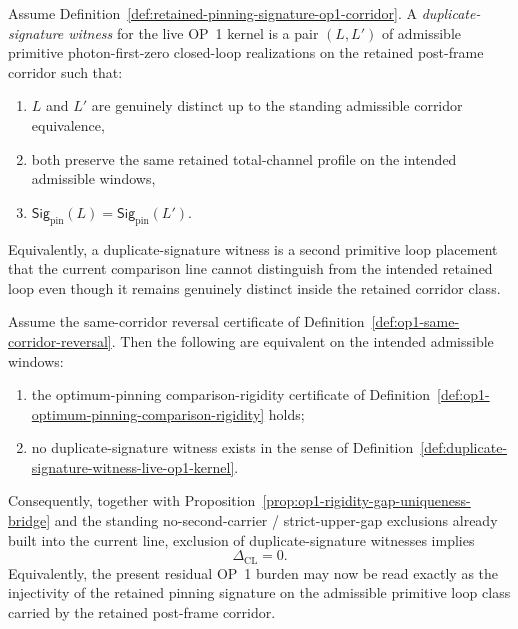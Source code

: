 \begin{definition}
\label{def:duplicate-signature-witness-live-op1-kernel}
Assume Definition~\ref{def:retained-pinning-signature-op1-corridor}. A \emph{duplicate-signature witness} for the live OP~1 kernel is a pair $(L,L')$ of admissible primitive photon-first-zero closed-loop realizations on the retained post-frame corridor such that:
\begin{enumerate}[label=(\roman*)]
    \item $L$ and $L'$ are genuinely distinct up to the standing admissible corridor equivalence,
    \item both preserve the same retained total-channel profile on the intended admissible windows,
    \item \(\mathsf{Sig}_{\mathrm{pin}}(L)=\mathsf{Sig}_{\mathrm{pin}}(L')\).
\end{enumerate}
Equivalently, a duplicate-signature witness is a second primitive loop placement that the current comparison line cannot distinguish from the intended retained loop even though it remains genuinely distinct inside the retained corridor class.
\end{definition}

\begin{proposition}
\label{prop:live-op1-burden-equivalent-exclusion-duplicate-signature-witnesses}
Assume the same-corridor reversal certificate of Definition~\ref{def:op1-same-corridor-reversal}. Then the following are equivalent on the intended admissible windows:
\begin{enumerate}[label=(\roman*)]
    \item the optimum-pinning comparison-rigidity certificate of Definition~\ref{def:op1-optimum-pinning-comparison-rigidity} holds;
    \item no duplicate-signature witness exists in the sense of Definition~\ref{def:duplicate-signature-witness-live-op1-kernel}.
\end{enumerate}
Consequently, together with Proposition~\ref{prop:op1-rigidity-gap-uniqueness-bridge} and the standing no-second-carrier / strict-upper-gap exclusions already built into the current line, exclusion of duplicate-signature witnesses implies
\[
\Delta_{\mathrm{CL}}=0.
\]
Equivalently, the present residual OP~1 burden may now be read exactly as the injectivity of the retained pinning signature on the admissible primitive loop class carried by the retained post-frame corridor.
\end{proposition}


